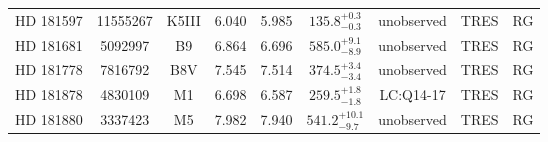 \begin{table*}
\begin{tabular}{ccccccccc}
HD 181597 & 11555267 & K5III & 6.040 & 5.985 & $135.8^{+0.3}_{-0.3}$ & unobserved & TRES & RG \\
HD 181681 & 5092997 & B9 & 6.864 & 6.696 & $585.0^{+9.1}_{-8.9}$ & unobserved & TRES & RG \\
HD 181778 & 7816792 & B8V & 7.545 & 7.514 & $374.5^{+3.4}_{-3.4}$ & unobserved & TRES & RG \\
HD 181878 & 4830109 & M1 & 6.698 & 6.587 & $259.5^{+1.8}_{-1.8}$ & LC:Q14-17 & TRES & RG \\
HD 181880 & 3337423 & M5 & 7.982 & 7.940 & $541.2^{+10.1}_{-9.7}$ & unobserved & TRES & RG \\
\hline
\end{tabular}
\end{table*}
